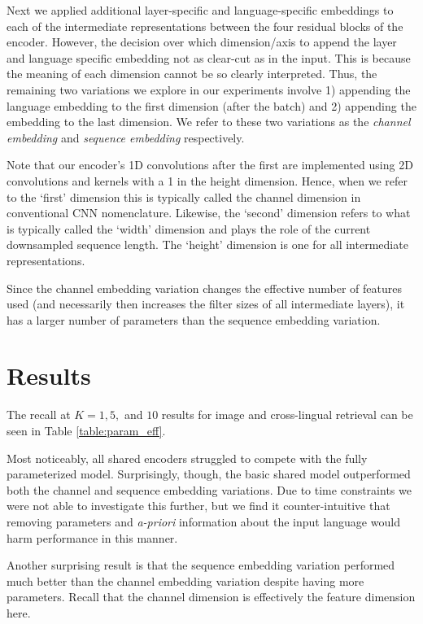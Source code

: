 Next we applied additional layer-specific and language-specific embeddings to each of the intermediate representations between the four residual blocks of the encoder.
However, the decision over which dimension/axis to append the layer and language specific embedding not as clear-cut as in the input. 
This is because the meaning of each dimension cannot be so clearly interpreted.
Thus, the remaining two variations we explore in our experiments involve 1) appending the language embedding to the first dimension (after the batch) and 2) appending the embedding to the last dimension.
We refer to these two variations as the \textit{channel embedding} and \textit{sequence embedding} respectively.

Note that our encoder's 1D convolutions after the first are implemented using 2D convolutions and kernels with a 1 in the height dimension.
Hence, when we refer to the `first' dimension this is typically called the channel dimension in conventional CNN nomenclature.
Likewise, the `second' dimension refers to what is typically called the `width' dimension and plays the role of the current downsampled sequence length.
The `height' dimension is one for all intermediate representations.

Since the channel embedding variation changes the effective number of features used (and necessarily then increases the filter sizes of all intermediate layers), it has a larger number of parameters than the sequence embedding variation.

\section{Results}
The recall at $K=1,5,$ and $10$ results for image and cross-lingual retrieval can be seen in Table \ref{table:param_eff}.



Most noticeably, all shared encoders struggled to compete with the fully parameterized model.
Surprisingly, though, the basic shared model outperformed both the channel and sequence embedding variations.
Due to time constraints we were not able to investigate this further, but we find it counter-intuitive that removing parameters and \textit{a-priori} information about the input language would harm performance in this manner.

Another surprising result is that the sequence embedding variation performed much better than the channel embedding variation despite having more parameters.
Recall that the channel dimension is effectively the feature dimension here.


